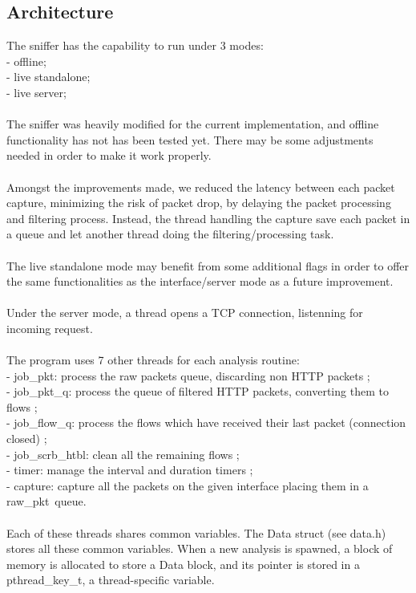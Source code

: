 \documentclass[12pt,hidelinks]{article}
\begin{document}
\subsection{Architecture}
The sniffer has the capability to run under 3 modes: \\
    - offline; \\
    - live standalone; \\
    - live server; \\
\\
The sniffer was heavily modified for the current implementation, and offline functionality has not has been tested yet. 
There may be some adjustments needed in order to make it work properly. \\
\\
Amongst the improvements made, we reduced the latency between each packet capture, minimizing the risk of packet drop, by delaying the packet processing and filtering process.
Instead, the thread handling the capture save each packet in a queue and let another thread doing the filtering/processing task. \\
\\
The live standalone mode may benefit from some additional flags in order to offer the same functionalities as the interface/server mode as a future improvement. \\
\\
Under the server mode, a thread opens a TCP connection, listenning for incoming request. \\
\\
The program uses 7 other threads for each analysis routine: \\
- job\_pkt: process the raw packets queue, discarding non HTTP packets ; \\
- job\_pkt\_q: process the queue of filtered HTTP packets, converting them to flows ; \\
- job\_flow\_q: process the flows which have received their last packet (connection closed) ; \\
- job\_scrb\_htbl: clean all the remaining flows ; \\
- timer: manage the interval and duration timers ; \\
- capture: capture all the packets on the given interface placing them in a raw\_pkt\ queue. \\
\\
Each of these threads shares common variables. 
The Data struct (see data.h) stores all these common variables. When a new analysis is spawned, a block of memory is allocated to store a Data block, and its pointer is stored in a pthread\_key\_t, a thread-specific variable.
\end{document}
